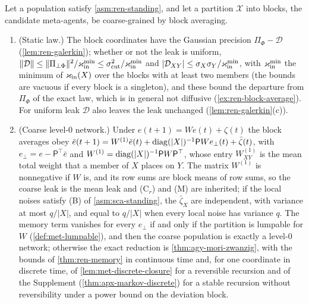 \begin{theorem}\label{thm:ren-closure}
Let a population satisfy \cref{asm:ren-standing}, and let a partition $\mathcal X$ into blocks, the candidate meta-agents, be coarse-grained by block averaging.
\begin{enumerate}
\item[(a)] (Static law.) The block coordinates have the Gaussian precision $\Pi_\Phi-\mathcal D$ (\cref{lem:ren-galerkin}); whether or not the leak is uniform, $\Vert\mathcal D\Vert\le\Vert\Pi_{\perp\Phi}\Vert^2/\varkappa_{\mathrm{in}}^{\min}\le\sigma^2_{\mathrm{cut}}/\varkappa_{\mathrm{in}}^{\min}$ and $\lvert\mathcal D_{XY}\rvert\le\sigma_X\sigma_Y/\varkappa_{\mathrm{in}}^{\min}$, with $\varkappa_{\mathrm{in}}^{\min}$ the minimum of $\varkappa_{\mathrm{in}}(X)$ over the blocks with at least two members (the bounds are vacuous if every block is a singleton), and these bound the departure from $\Pi_\Phi$ of the exact law, which is in general not diffusive (\cref{ex:ren-block-average}). For uniform leak $\mathcal D$ also leaves the leak unchanged (\cref{lem:ren-galerkin}(c)).
\item[(b)] (Coarse level-0 network.) Under $e(t+1)=We(t)+\zeta(t)$ the block averages obey $\bar e(t+1)=W^{(1)}\bar e(t)+\operatorname{diag}(\lvert X\rvert)^{-1}\mathsf PWe_\perp(t)+\bar\zeta(t)$, with $e_\perp=e-\mathsf P^\top\bar e$ and $W^{(1)}=\operatorname{diag}(\lvert X\rvert)^{-1}\mathsf PW\mathsf P^\top$, whose entry $W^{(1)}_{XY}$ is the mean total weight that a member of $X$ places on $Y$. The matrix $W^{(1)}$ is nonnegative if $W$ is, and its row sums are block means of row sums, so the coarse leak is the mean leak and \textup{(C$_r$)} and \textup{(M)} are inherited; if the local noises satisfy \textup{(B)} of \cref{asm:sca-standing}, the $\bar\zeta_X$ are independent, with variance at most $q/\lvert X\rvert$, and equal to $q/\lvert X\rvert$ when every local noise has variance $q$. The memory term vanishes for every $e_\perp$ if and only if the partition is lumpable for $W$ (\cref{def:met-lumpable}), and then the coarse population is exactly a level-0 network; otherwise the exact reduction is \cref{thm:agy-mori-zwanzig}, with the bounds of \cref{thm:ren-memory} in continuous time and, for one coordinate in discrete time, of \cref{lem:met-discrete-closure} for a reversible recursion and of the Supplement (\cref{thm:apx-markov-discrete}) for a stable recursion without reversibility under a power bound on the deviation block.

\end{enumerate}
\end{theorem}
